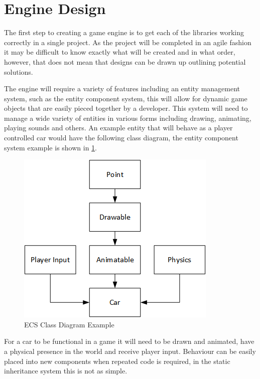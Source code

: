 \documentclass[11pt,a4paper,titlepage]{report}
\begin{document}

\section{Engine Design}

	The first step to creating a game engine is to get each of the libraries working correctly in a single project. As the project will be completed in an agile fashion it may be difficult to know exactly what will be created and in what order, however, that does not mean that designs can be drawn up outlining potential solutions.

	The engine will require a variety of features including an entity management system, such as the entity component system, this will allow for dynamic game objects that are easily pieced together by a developer. This system will need to manage a wide variety of entities in various forms including drawing, animating, playing sounds and others. An example entity that will behave as a player controlled car would have the following class diagram, the entity component system example is shown in \ref{fig:ClassDiagram1}.

	\begin{figure}[h] 
		\centering
		\includegraphics[scale=0.75]{ECS1}
		\caption{ECS Class Diagram Example}
		\label{fig:ClassDiagram1}
	\end{figure}

	For a car to be functional in a game it will need to be drawn and animated, have a physical presence in the world and receive player input. Behaviour can be easily placed into new components when repeated code is required, in the static inheritance system this is not as simple.
\end{document}
